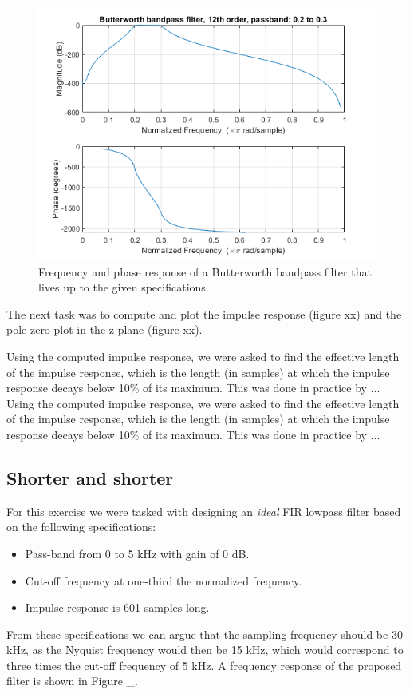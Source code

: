 \documentclass[journal]{IEEEtran}
\begin{document}
\begin{figure} [H]
    \centering
    \includegraphics[width=\linewidth]{assignment_02/plots/butterbandfreq.png}
    \caption{Frequency and phase response of a Butterworth bandpass filter that lives up to the given specifications.}
    \label{fig:butterband}
\end{figure}

The next task was to compute and plot the impulse response (figure xx) and the pole-zero plot in the z-plane (figure xx). 

Using the computed impulse response, we were asked to find the effective length of the impulse response, which is the length (in samples) at which the impulse response decays below 10\% of its maximum. This was done in practice by ...
Using the computed impulse response, we were asked to find the effective length of the impulse response, which is the length (in samples) at which the impulse response decays below 10\% of its maximum. This was done in practice by ...

\subsection{Shorter and shorter}
For this exercise we were tasked with designing an \textit{ideal} FIR lowpass filter based on the following specifications: 
\begin{itemize}
    \item Pass-band from 0 to 5 kHz with gain of 0 dB. 
    \item Cut-off frequency at one-third the normalized frequency. 
    \item Impulse response is 601 samples long. 
\end{itemize}
From these specifications we can argue that the sampling frequency should be 30 kHz, as the Nyquist frequency would then be 15 kHz, which would correspond to three times the cut-off frequency of 5 kHz. A frequency response of the proposed filter is shown in Figure \_. 
\end{document}
